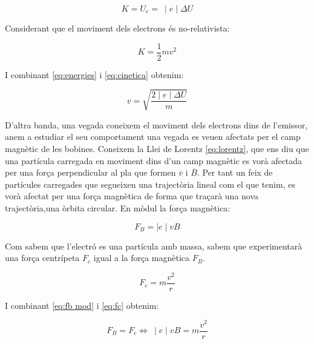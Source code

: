 \documentclass[11pt]{article}
\begin{document}
    \begin{equation}
        K = U_e =\ \mid e\mid \Delta U
        \label{eq:energies}
    \end{equation}

    \vspace{0.4cm}Considerant que el moviment dels electrons és no-relativista:
    
    \begin{equation}
        K = \frac12 mv^2
        \label{eq:cinetica}
    \end{equation}

    I combinant \ref{eq:energies} i \ref{eq:cinetica} obtenim:

    \begin{equation}
        v = \sqrt{\frac{2\mid e\mid\Delta U}{m}}
        \label{eq:velocitat}
    \end{equation}

    D'altra banda, una vegada coneixem el moviment dels electrons dins de l'emissor, anem a estudiar el seu comportament una vegada es veuen afectats per el camp magnètic de les bobines. Coneixem la Llei de Lorentz \ref{eq:lorentz}, que ens diu que una partícula carregada en moviment dins d'un camp magnètic es vorà afectada per una força perpendicular al pla que formen $\overline{v}$ i $\overline{B}$. Per tant un feix de partícules carregades que segueixen una trajectòria lineal com el que tenim, es vorà afectat per una força magnètica de forma que traçarà una nova trajectòria,una òrbita circular. En mòdul la força magnètica:

    \begin{equation}
        F_B = \mid e\mid v B
        \label{eq:fb mod}
    \end{equation}

    \vspace{0.4cm}Com sabem que l'electró es una partícula amb massa, sabem que experimentarà una força centrípeta $F_c$ igual a la força magnètica $F_B$.

    \begin{equation}
        F_c = m\frac{v^2}{r}
        \label{eq:fc}
    \end{equation}

    I combinant \ref{eq:fb mod} i \ref{eq:fc} obtenim:

    \begin{equation}
        F_B = F_c \Longleftrightarrow\  \mid e\mid v B = m\frac{v^2}{r}
        \label{eq:fb}
    \end{equation}
\end{document}
